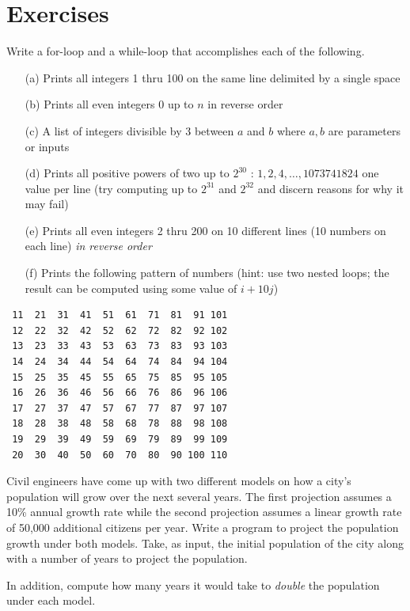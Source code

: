 

\section{Exercises}

\begin{exer}
Write a for-loop and a while-loop that accomplishes each of the following.
\begin{enumerate}
  \item[(a)] Prints all integers 1 thru 100 on the same line delimited by a single space
  \item[(b)] Prints all even integers 0 up to $n$ in reverse order
  \item[(c)] A list of integers divisible by 3 between $a$ and $b$ where $a, b$ are parameters or inputs
  \item[(d)] Prints all positive powers of two up to $2^{30}$ : $1, 2, 4, \ldots, 1073741824$ one value per line (try computing up to $2^{31}$ and $2^{32}$ and discern reasons for why it may fail)
  \item[(e)] Prints all even integers 2 thru 200 on 10 different lines (10 numbers on each line) \emph{in reverse order}
  \item[(f)] Prints the following pattern of numbers (hint: use two nested loops; the result can be computed using some value of $i + 10j$)
\end{enumerate}

\begin{verbatim}
 11  21  31  41  51  61  71  81  91 101
 12  22  32  42  52  62  72  82  92 102
 13  23  33  43  53  63  73  83  93 103
 14  24  34  44  54  64  74  84  94 104
 15  25  35  45  55  65  75  85  95 105
 16  26  36  46  56  66  76  86  96 106
 17  27  37  47  57  67  77  87  97 107
 18  28  38  48  58  68  78  88  98 108
 19  29  39  49  59  69  79  89  99 109
 20  30  40  50  60  70  80  90 100 110
   \end{verbatim}
\end{exer}

\begin{exer}
Civil engineers have come up with two different models on how a city's 
population will grow over the next several years.  The first projection assumes
a 10\% annual growth rate while the second projection assumes a linear growth
rate of 50,000 additional citizens per year.  Write a program to project the
population growth under both models.  Take, as input, the initial population of
the city along with a number of years to project the population.

In addition, compute how many years it would take to \emph{double} the population
under each model.
\end{exer}

